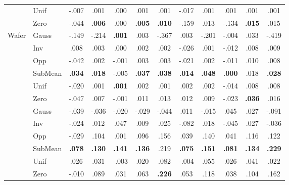 \begin{table}[!htbp]
\begin{tabular*}{\textwidth}{@{\extracolsep{\fill}} llcccccccccc @{}}
 & Unif & -.007 & .001 & .000 & .001 & .001 & -.017 & .001 & .001 & .001 & .001 \\
 & Zero & -.044 & \textbf{.006} & .000 & \textbf{.005} & \textbf{.010} & -.159 & .013 & -.134 & \textbf{.015} & .015 \\
\cline{1-12}
\multirow[t]{7}{*}{Wafer} & Gauss & -.149 & -.214 & \textbf{.001} & .003 & -.367 & .003 & -.201 & -.004 & .033 & -.419 \\
 & Inv & .008 & .003 & .000 & .002 & .002 & -.026 & .001 & -.012 & .008 & .009 \\
 & Opp & -.042 & .002 & -.001 & .003 & .003 & -.021 & .002 & -.011 & .010 & .008 \\
 & SubMean & \textbf{.034} & \textbf{.018} & -.005 & \textbf{.037} & \textbf{.038} & \textbf{.014} & \textbf{.048} & \textbf{.000} & .018 & \textbf{.028} \\
 & Unif & -.020 & .001 & \textbf{.001} & .002 & .001 & .002 & .002 & -.014 & .008 & .008 \\
 & Zero & -.047 & .007 & -.001 & .011 & .013 & .012 & .009 & -.023 & \textbf{.036} & .016 \\
\cline{1-12}
\multirow[t]{7}{*}{ElecDev} & Gauss & -.039 & -.036 & -.020 & -.029 & -.044 & .011 & -.015 & .045 & .027 & -.091 \\
 & Inv & -.024 & .012 & .047 & .009 & .025 & -.082 & .018 & -.045 & .027 & -.036 \\
 & Opp & -.029 & .104 & .001 & .096 & .156 & .039 & .140 & .041 & .116 & .122 \\
 & SubMean & \textbf{.078} & \textbf{.130} & \textbf{.141} & \textbf{.136} & .219 & \textbf{.075} & \textbf{.151} & \textbf{.081} & \textbf{.134} & \textbf{.229} \\
 & Unif & .026 & .031 & -.003 & .020 & .082 & -.004 & .055 & .026 & .041 & .022 \\
 & Zero & -.010 & .089 & .031 & .063 & \textbf{.226} & .053 & .118 & .038 & .104 & .162 \\
\cline{1-12}
\bottomrule
\end{tabular*}
\end{table}